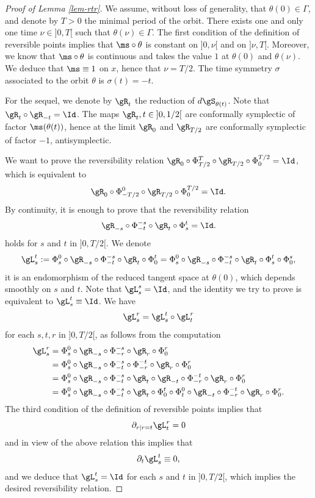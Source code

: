 \begin{proof}[Proof of Lemma \ref{lem-rtr}]
We assume, without loss of generality, that $\theta(0)\in \Gamma$, and denote by $T>0$ the minimal period of the orbit.
There exists one and only one time $\nu\in{}]0,T[$ such that $\theta (\nu)\in \Gamma$.
The first condition of the definition of reversible points implies that $ \ms\circ \theta$ is constant on $]0,\nu[$ and
on $]\nu,T[$. Moreover, we know that $\ms\circ \theta$ is continuous and takes the value $1$ at $\theta(0)$ and $\theta(\nu)$.
We deduce that $\ms\equiv 1$ on $x$, hence that $\nu=T/2$. The time symmetry $\sigma$ associated to the orbit $\theta$ is
$\sigma (t)=-t$.

For the sequel, we denote by $\gR_t$ the reduction of $d\gS_{\theta(t)}$. Note that $\gR_t\circ \gR_{-t}=\Id$.
The maps $\gR_t, t\in{}]0,1/2[$ are conformally symplectic of factor $\ms(\theta(t))$, hence at the limit $\gR_0$ and $\gR_{T/2}$
are conformally symplectic of factor $-1$, \ie antisymplectic.

We want to prove the reversibility relation
$
\gR_0\circ \Phi_{T/2}^T\circ \gR_{T/2}\circ \Phi_{0}^{T/2}=\Id
$,
which is equivalent to
\[
\gR_0\circ \Phi_{-T/2}^0\circ \gR_{T/2}\circ \Phi_{0}^{T/2}=\Id.
\]
By continuity, it is enough to prove that the reversibility relation
\[
\gR_{-s}\circ \Phi_{-t}^{-s}\circ\gR_{t}\circ \Phi_s^t=\Id.
\]
holds for $s$ and $t$ in $]0,T/2[$.
We denote
\[
\gL_s^t:=
\Phi_s^0 \circ
\gR_{-s}\circ \Phi_{-t}^{-s}\circ\gR_{t}\circ \Phi_0^t
=\Phi_s^0
\circ
\gR_{-s}\circ \Phi_{-t}^{-s}\circ\gR_{t}\circ \Phi_s^t\circ \Phi_0^s,
\]
it is an endomorphism of the reduced tangent space at $\theta(0)$, which depends smoothly on $s$ and $t$.
Note that $\gL_s^s=\Id$, and the identity we try to prove is equivalent to $\gL_s^t\equiv \Id$.
We have
\[
\gL_s^r=\gL_s^t\circ \gL_t^r
\]
for each $s,t,r$ in $]0,T/2[$, as follows from the computation
\begin{align*}
\gL_s^r
&= \Phi_s^0 \circ \gR_{-s}\circ \Phi_{-r}^{-s}\circ\gR_{r}\circ \Phi_0^r\\
&=\Phi_s^0 \circ \gR_{-s}\circ \Phi_{-t}^{-s}\circ \Phi_{-r}^{-t}\circ \gR_{r}\circ \Phi_0^r\\
&=\Phi_s^0 \circ \gR_{-s}\circ \Phi_{-t}^{-s}\circ \gR_t\circ \gR_{-t}\circ \Phi_{-r}^{-t}\circ \gR_{r}\circ \Phi_0^r\\
&=\Phi_s^0 \circ \gR_{-s}\circ \Phi_{-t}^{-s}\circ \gR_t\circ \Phi_0^t\circ \Phi_t^0\circ \gR_{-t}\circ \Phi_{-r}^{-t}\circ \gR_{r}\circ \Phi_0^r.
\end{align*}
The third condition of the definition of reversible points implies that
\[
\partial_{r|r=t}\gL_t^r=0\]
and in view of the above relation this implies that
\[
\partial_t \gL_s^t\equiv 0,\]
and we deduce that $\gL_s^t=\Id$ for each $s$ and $t$ in $]0,T/2[$, which implies the desired reversibility relation.
\end{proof}

